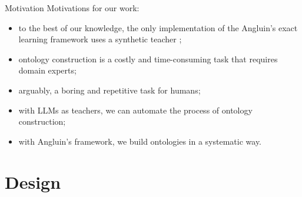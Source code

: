 \documentclass[handout]{beamer}\mode<handout>{\usetheme{AMSBolognaFC}}
\begin{document}
\begin{frame}[c]{Motivation}
    Motivations for our work:
    \vfill
    \begin{itemize}
        \item to the best of our knowledge, the only implementation of the Angluin's exact learning framework uses a \alert{synthetic teacher} ;
        \item ontology construction is a costly and time-consuming task that requires domain experts;
        \item arguably, a boring and repetitive task for humans;
        \item with LLMs as teachers, we can \alert{automate} the process of ontology construction;
        \item with Angluin's framework, we build ontologies in a systematic way.
    \end{itemize}
\end{frame}


\section{Design}
\end{document}
